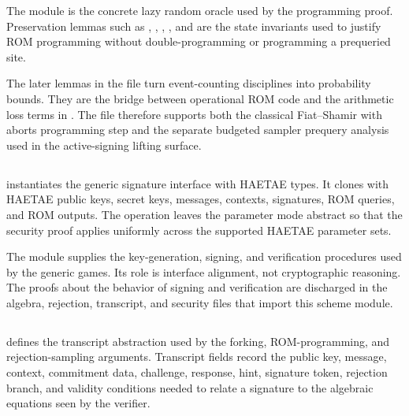 The module  is the concrete lazy random oracle used by the
programming proof.  Preservation lemmas such as
,
,
,
, and
 are the
state invariants used to justify ROM programming without double-programming or
programming a prequeried site.

The later lemmas in the file turn event-counting disciplines into probability
bounds.  They are the bridge between operational ROM code and the arithmetic
loss terms in .  The file therefore supports both
the classical Fiat--Shamir with aborts programming step and the separate
budgeted sampler prequery analysis used in the active-signing lifting surface.

\subsection[HAETAE\_Scheme.ec]{\texorpdfstring{}{HAETAE\_Scheme.ec}}

 instantiates the generic signature interface with
HAETAE types.  It clones  with HAETAE public keys, secret
keys, messages, contexts, signatures, ROM queries, and ROM outputs.  The
operation  leaves the parameter mode abstract so that the
security proof applies uniformly across the supported HAETAE parameter sets.

The module  supplies the key-generation, signing, and verification
procedures used by the generic games.  Its role is interface alignment, not
cryptographic reasoning.  The proofs about the behavior of signing and
verification are discharged in the algebra, rejection, transcript, and security
files that import this scheme module.

\subsection[HAETAE\_Transcript.ec]{\texorpdfstring{}{HAETAE\_Transcript.ec}}

 defines the transcript abstraction used by the
forking, ROM-programming, and rejection-sampling arguments.  Transcript fields
record the public key, message, context, commitment data, challenge, response,
hint, signature token, rejection branch, and validity conditions needed to relate
a signature to the algebraic equations seen by the verifier.

